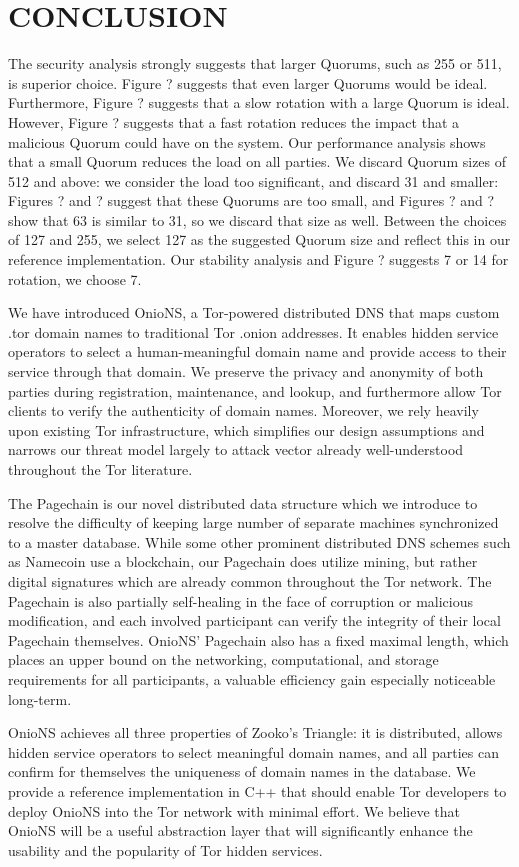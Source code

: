 
\chapter{CONCLUSION}

The security analysis strongly suggests that larger Quorums, such as 255 or 511, is superior choice. Figure ? suggests that even larger Quorums would be ideal. Furthermore, Figure ? suggests that a slow rotation with a large Quorum is ideal. However, Figure ? suggests that a fast rotation reduces the impact that a malicious Quorum could have on the system. Our performance analysis shows that a small Quorum reduces the load on all parties. We discard Quorum sizes of 512 and above: we consider the load too significant, and discard 31 and smaller: Figures ? and ? suggest that these Quorums are too small, and Figures ? and ? show that 63 is similar to 31, so we discard that size as well. Between the choices of 127 and 255, we select 127 as the suggested Quorum size and reflect this in our reference implementation. Our stability analysis and Figure ? suggests 7 or 14 for rotation, we choose 7. 


We have introduced OnioNS, a Tor-powered distributed DNS that maps custom .tor domain names to traditional Tor .onion addresses. It enables hidden service operators to select a human-meaningful domain name and provide access to their service through that domain. We preserve the privacy and anonymity of both parties during registration, maintenance, and lookup, and furthermore allow Tor clients to verify the authenticity of domain names. Moreover, we rely heavily upon existing Tor infrastructure, which simplifies our design assumptions and narrows our threat model largely to attack vector already well-understood throughout the Tor literature.

The Pagechain is our novel distributed data structure which we introduce to resolve the difficulty of keeping large number of separate machines synchronized to a master database. While some other prominent distributed DNS schemes such as Namecoin use a blockchain, our Pagechain does utilize mining, but rather digital signatures which are already common throughout the Tor network. The Pagechain is also partially self-healing in the face of corruption or malicious modification, and each involved participant can verify the integrity of their local Pagechain themselves. OnioNS' Pagechain also has a fixed maximal length, which places an upper bound on the networking, computational, and storage requirements for all participants, a valuable efficiency gain especially noticeable long-term.

OnioNS achieves all three properties of Zooko's Triangle: it is distributed, allows hidden service operators to select meaningful domain names, and all parties can confirm for themselves the uniqueness of domain names in the database. We provide a reference implementation in C++ that should enable Tor developers to deploy OnioNS into the Tor network with minimal effort. We believe that OnioNS will be a useful abstraction layer that will significantly enhance the usability and the popularity of Tor hidden services. 